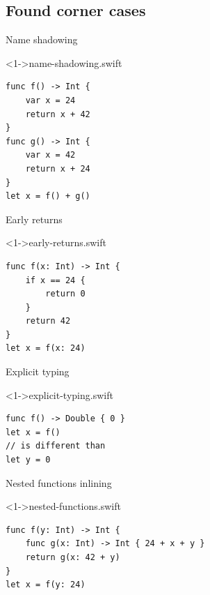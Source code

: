 \documentclass[hyperref={pdfpagelabels=false},xcolor={dvipsnames},compress,table,usenames,dvipsnames]{beamer}
\begin{document}
    \subsection{Found corner cases}

    \begin{frame}[fragile]{Name shadowing}
        \begin{exampleblock}
            <1->{name-shadowing.swift}
            \begin{lstlisting}
func f() -> Int {
    var x = 24
    return x + 42
}
func g() -> Int {
    var x = 42
    return x + 24
}
let x = f() + g()
            \end{lstlisting}
        \end{exampleblock}
    \end{frame}

    \begin{frame}[fragile]{Early returns}
        \begin{exampleblock}
            <1->{early-returns.swift}
            \begin{lstlisting}
func f(x: Int) -> Int {
    if x == 24 {
        return 0
    }
    return 42
}
let x = f(x: 24)
            \end{lstlisting}
        \end{exampleblock}
    \end{frame}

    \begin{frame}[fragile]{Explicit typing}
        \begin{exampleblock}
            <1->{explicit-typing.swift}
            \begin{lstlisting}
func f() -> Double { 0 }
let x = f()  
// is different than 
let y = 0
            \end{lstlisting}
        \end{exampleblock}
    \end{frame}

    \begin{frame}[fragile]{Nested functions inlining}
        \begin{exampleblock}
            <1->{nested-functions.swift}
            \begin{lstlisting}
func f(y: Int) -> Int {
    func g(x: Int) -> Int { 24 + x + y }
    return g(x: 42 + y)
}
let x = f(y: 24)
            \end{lstlisting}
        \end{exampleblock}
    \end{frame}
\end{document}
